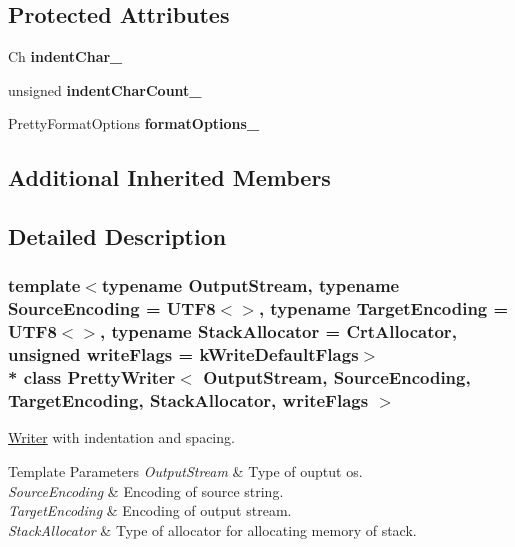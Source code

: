\subsection*{Protected Attributes}
\begin{DoxyCompactItemize}
\item 
Ch {\bfseries indent\+Char\+\_\+}\hypertarget{class_pretty_writer_aaa3f6380daa8466a5101ed18fc33bf04}{}\label{class_pretty_writer_aaa3f6380daa8466a5101ed18fc33bf04}

\item 
unsigned {\bfseries indent\+Char\+Count\+\_\+}\hypertarget{class_pretty_writer_a7d00b9716ef3cd7e34ae1b744c968f13}{}\label{class_pretty_writer_a7d00b9716ef3cd7e34ae1b744c968f13}

\item 
Pretty\+Format\+Options {\bfseries format\+Options\+\_\+}\hypertarget{class_pretty_writer_a15505ed4ea0fa85d339b3a987f1a3aaf}{}\label{class_pretty_writer_a15505ed4ea0fa85d339b3a987f1a3aaf}

\end{DoxyCompactItemize}
\subsection*{Additional Inherited Members}


\subsection{Detailed Description}
\subsubsection*{template$<$typename Output\+Stream, typename Source\+Encoding = U\+T\+F8$<$$>$, typename Target\+Encoding = U\+T\+F8$<$$>$, typename Stack\+Allocator = Crt\+Allocator, unsigned write\+Flags = k\+Write\+Default\+Flags$>$\\*
class Pretty\+Writer$<$ Output\+Stream, Source\+Encoding, Target\+Encoding, Stack\+Allocator, write\+Flags $>$}

\hyperlink{class_writer}{Writer} with indentation and spacing. 


\begin{DoxyTemplParams}{Template Parameters}
{\em Output\+Stream} & Type of ouptut os. \\
\hline
{\em Source\+Encoding} & Encoding of source string. \\
\hline
{\em Target\+Encoding} & Encoding of output stream. \\
\hline
{\em Stack\+Allocator} & Type of allocator for allocating memory of stack. \\
\hline
\end{DoxyTemplParams}


